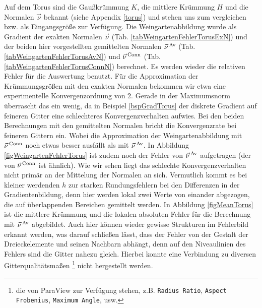     \begin{beispiel}[Torus]
    \label{bspWeinTorus}
      Auf dem Torus sind die Gaußkrümmung \( K \), die mittlere Krümmung \( H \) und die Normalen \( \vec{\nu} \) bekannt (siehe Appendix
      \ref{torus}) und stehen uns zum vergleichen bzw. als Eingangsgröße zur Verfügung.
      Die Weingartenabbildung wurde als Gradient der exakten Normalen \( \vec{\nu} \) (Tab. \ref{tabWeingartenFehlerTorusExN})
      und der beiden hier vorgestellten gemittelten Normalen 
      \( \vec{\nu}^{\,\text{Av}} \) (Tab. \ref{tabWeingartenFehlerTorusAvN}) und 
      \( \vec{\nu}^{\,\text{Conn}} \) (Tab. \ref{tabWeingartenFehlerTorusConnN}) berechnet.
      Es werden wieder die relativen Fehler für die Auswertung benutzt.
      Für die Approximation der Krümmungsgrößen mit den exakten Normalen bekommen wir etwa eine experimentelle Konvergenzordnung von 2.
      Gerade in der Maximumsnorm überrascht das ein wenig, da in Beispiel \ref{bspGradTorus} der diskrete Gradient auf feineren Gitter eine
      schlechteres Konvergenzverhalten aufwies.
      Bei den beiden Berechnungen mit den gemittelten Normalen bricht die Konvergenzrate bei feineren Gittern ein. 
      Wobei die Approximation der Weingartenabbildung mit \( \vec{\nu}^{\,\text{Conn}} \) noch etwas besser ausfällt als mit \(
      \vec{\nu}^{\,\text{Av}} \).
      In Abbildung \ref{figWeingartenFehlerTorus} ist zudem noch der Fehler von \( \vec{\nu}^{\,\text{Av}} \) aufgetragen 
      (der von \( \vec{\nu}^{\,\text{Conn}} \) ist ähnlich).
      Wie wir sehen liegt das schlechte Konvergenzverhalten nicht primär an der Mittelung der Normalen an sich.
      Vermutlich kommt es bei kleiner werdenden \( h \) zur starken Rundungsfehlern bei den Differenzen in der 
      Gradientenbildung, denn
      hier werden lokal zwei Werte von einander abgezogen, die auf überlappenden Bereichen gemittelt werden. 
      In Abbildung \ref{figMeanTorus} ist die mittlere Krümmung und die lokalen absoluten Fehler für die Berechnung mit \(
      \vec{\nu}^{\,\text{Av}} \) abgebildet.
      Auch hier können wieder gewisse Strukturen im Fehlerbild erkannt werden, was darauf schließen lässt, dass der Fehler von der Gestalt
      der Dreieckelemente und seinen Nachbarn abhängt, denn auf den Niveaulinien des Fehlers sind die Gitter nahezu gleich.
      Hierbei konnte eine Verbindung zu diversen Gitterqualitätsmaßen
      \footnote{die von ParaView zur Verfügung stehen, z.B. \texttt{Radius Ratio}, \texttt{Aspect Frobenius}, \texttt{Maximum Angle}, usw.}
      nicht hergestellt werden.
      \begin{table}[htbp]

\end{table}
\end{beispiel}

